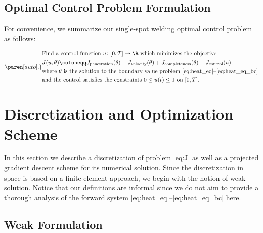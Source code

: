 \subsection{Optimal Control Problem Formulation}

For convenience, we summarize our single-spot welding optimal control problem as follows:

\begin{equation} \label{eq:J}
	\paren[auto].\}{%
		\begin{aligned}
			&
			\text{Find a control function $u \colon [0,T] \to \R$ which minimizes the objective}
			\\
			&
			J(u,\theta) 
			\coloneqq 
			J_\textup{penetration}(\theta) + J_\textup{velocity}(\theta) + J_\textup{completeness}(\theta) + J_\textup{control}(u)
			,
			\\
			&
			\text{where $\theta$ is the solution to the boundary value problem \eqref{eq:heat_eq}--\eqref{eq:heat_eq_bc}}
			\\
			&
			\text{and the control satisfies the constraints $0 \le u(t) \le 1$ on $[0,T]$}
			.
		\end{aligned}
	}
\end{equation}


\section{Discretization and Optimization Scheme}
\label{sec:discretization}

In this section we describe a discretization of problem \eqref{eq:J} as well as a projected gradient descent scheme for its numerical solution.
Since the discretization in space is based on a finite element approach, we begin with the notion of weak solution.
Notice that our definitions are informal since we do not aim to provide a thorough analysis of the forward system \eqref{eq:heat_eq}--\eqref{eq:heat_eq_bc} here.


\subsection{Weak Formulation}

